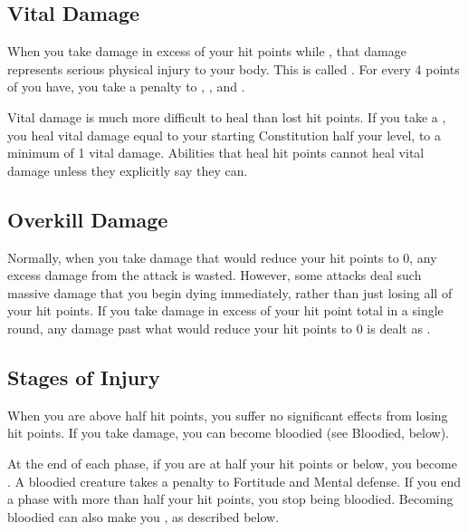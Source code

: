     \subsection{Vital Damage}\label{Vital Damage}
        When you take damage in excess of your hit points while , that damage represents serious physical injury to your body.
        This is called .
        For every 4 points of  you have, you take a  penalty to , , and .

         Vital damage is much more difficult to heal than lost hit points.
        If you take a , you heal vital damage equal to your starting Constitution \add half your level, to a minimum of 1 vital damage.
        Abilities that heal hit points cannot heal vital damage unless they explicitly say they can.

    \subsection{Overkill Damage}\label{Overkill Damage}
        Normally, when you take damage that would reduce your hit points to 0, any excess damage from the attack is wasted.
        However, some attacks deal such massive damage that you begin dying immediately, rather than just losing all of your hit points.
        If you take damage in excess of your  hit point total in a single round, any damage past what would reduce your hit points to 0 is dealt as .

    \subsection{Stages of Injury}

         When you are above half hit points, you suffer no significant effects from losing hit points.
        If you take damage, you can become bloodied (see Bloodied, below).

         At the end of each phase, if you are at half your hit points or below, you become .
        A bloodied creature takes a  penalty to Fortitude and Mental defense.
        If you end a phase with more than half your hit points, you stop being bloodied.
        Becoming bloodied can also make you , as described below.

